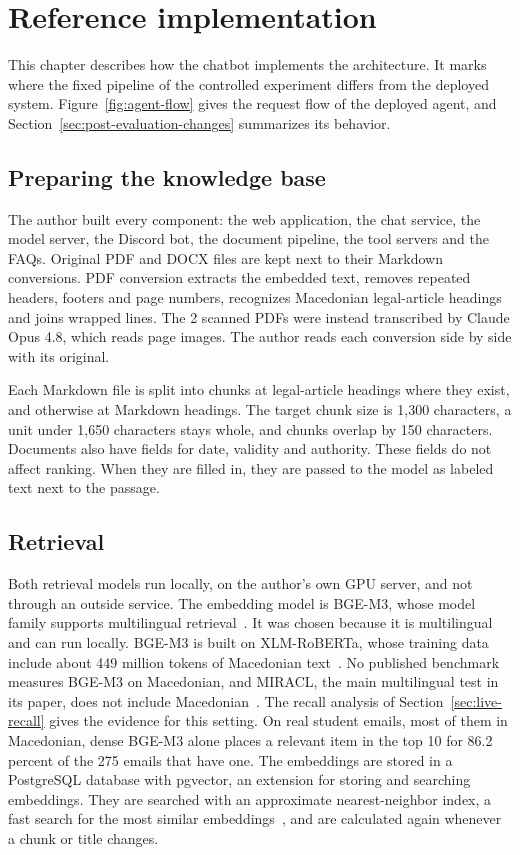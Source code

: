 \section{Reference implementation}
\label{ch:implementation}

This chapter describes how the chatbot implements the architecture. It marks where the fixed pipeline of the controlled experiment differs from the deployed system. Figure~\ref{fig:agent-flow} gives the request flow of the deployed agent, and Section~\ref{sec:post-evaluation-changes} summarizes its behavior.



\subsection{Preparing the knowledge base}

The author built every component: the web application, the chat service, the model server, the Discord bot, the document pipeline, the tool servers and the FAQs. Original PDF and DOCX files are kept next to their Markdown conversions. PDF conversion extracts the embedded text, removes repeated headers, footers and page numbers, recognizes Macedonian legal-article headings and joins wrapped lines. The 2 scanned PDFs were instead transcribed by Claude Opus 4.8, which reads page images. The author reads each conversion side by side with its original.

Each Markdown file is split into chunks at legal-article headings where they exist, and otherwise at Markdown headings. The target chunk size is 1,300 characters, a unit under 1,650 characters stays whole, and chunks overlap by 150 characters. Documents also have fields for date, validity and authority. These fields do not affect ranking. When they are filled in, they are passed to the model as labeled text next to the passage.

\subsection{Retrieval}

Both retrieval models run locally, on the author's own GPU server, and not through an outside service. The embedding model is BGE-M3, whose model family supports multilingual retrieval~\cite{chen2024m3}. It was chosen because it is multilingual and can run locally. BGE-M3 is built on XLM-RoBERTa, whose training data include about 449 million tokens of Macedonian text~\cite{conneau2020xlmr}. No published benchmark measures BGE-M3 on Macedonian, and MIRACL, the main multilingual test in its paper, does not include Macedonian~\cite{zhang2023miracl}. The recall analysis of Section~\ref{sec:live-recall} gives the evidence for this setting. On real student emails, most of them in Macedonian, dense BGE-M3 alone places a relevant item in the top 10 for 86.2 percent of the 275 emails that have one. The embeddings are stored in a PostgreSQL database with pgvector, an extension for storing and searching embeddings. They are searched with an approximate nearest-neighbor index, a fast search for the most similar embeddings~\cite{malkov2020hnsw}, and are calculated again whenever a chunk or title changes.

